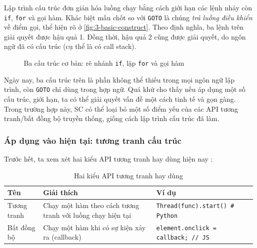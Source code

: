 \documentclass[../../thesis]{subfiles}
\begin{document}
Lập trình cấu trúc đơn giản hóa luồng chạy bằng cách giới hạn các lệnh nhảy còn
\texttt{if}, \texttt{for} và gọi hàm. Khác biệt mấu chốt so với \texttt{GOTO} là
chúng \emph{trả luồng điều khiển} về điểm gọi, thể hiện rõ ở
\autoref{fig:3-basic-construct}. Theo định nghĩa, ba lệnh trên giải quyết được
hậu quả 1. Đồng thời, hậu quả 2 cũng được giải quyết, do ngôn ngữ đã có cấu trúc
(cụ thể là có call stack).

\begin{figure}
    \centering
    \vspace*{-6mm}
    
    \vspace*{-10mm}
    \caption{Ba cấu trúc cơ bản: rẽ nhánh \texttt{if}, lặp \texttt{for} và gọi
        hàm \cite{NJS_SC}}
    \label{fig:3-basic-construct}
\end{figure}

Ngày nay, ba cấu trúc trên là phần không thể thiếu trong mọi ngôn ngữ lập trình,
còn \texttt{GOTO} chỉ dùng trong hợp ngữ. Quá khứ cho thấy nếu áp dụng một số
cấu trúc, giới hạn, ta có thể giải quyết vấn đề một cách tinh tế và gọn gàng.
Trong trường hợp này, SC có thể loại bỏ một số điểm yếu của các API tương
tranh/bất đồng bộ truyền thống, giống cách lập trình cấu trúc đã làm.

\subsubsection{Áp dụng vào hiện tại: tương tranh cấu trúc}

Trước hết, ta xem xét hai kiểu API tương tranh hay dùng hiện nay \cite{NJS_SC}:


\begin{table}[H]
    \centering
    \caption{Hai kiểu API tương tranh hay dùng \cite{NJS_SC}}
    \label{tab:2-async-apis}
    \begin{tabular}{l p{5.5cm} l}
        \toprule
        Tên         & Giải thích                                                 & Ví dụ \\
        \midrule
        Tương tranh & Chạy một hàm theo cách tương tranh với luồng chạy hiện tại & \texttt{Thread(func).start() # Python} \\
        Bất đồng bộ & Chạy một hàm khi có sự kiện xảy ra (callback)              & \texttt{element.onclick = callback; // JS} \\
        \bottomrule
    \end{tabular}
\end{table}
\end{document}
